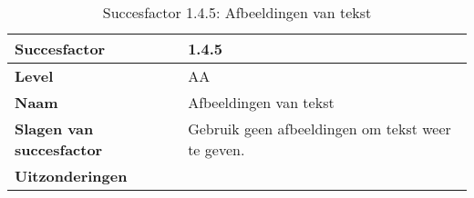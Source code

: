 \begin{table}[H]
    \centering
    \caption{Succesfactor 1.4.5: Afbeeldingen van tekst}
    \hspace*{-1cm}\begin{tabular}{|l|p{12cm}|} 
        \hline
        \textbf{Succesfactor}                 & 1.4.5                                                                                                                                                                                                                                                                                                                                                                                                                                                                                                             \\ 
        \hline
        \textbf{Level}                        & AA                                                                                                                                                                                                                                                                                                                                                                                                                                                                                                                 \\ 
        \hline
        \textbf{Naam}                         & Afbeeldingen van tekst~                                                                                                                                                                                                                                                                                                                                                                                                                                                                                      \\ 
        \hline
        \textbf{Slagen van succesfactor}      & Gebruik geen afbeeldingen om tekst weer te geven.                                                                                                                                                                                                                                                                                                                                                            \\ 
         \hline
        \textbf{Uitzonderingen}     & 

\end{tabular}
\end{table}
